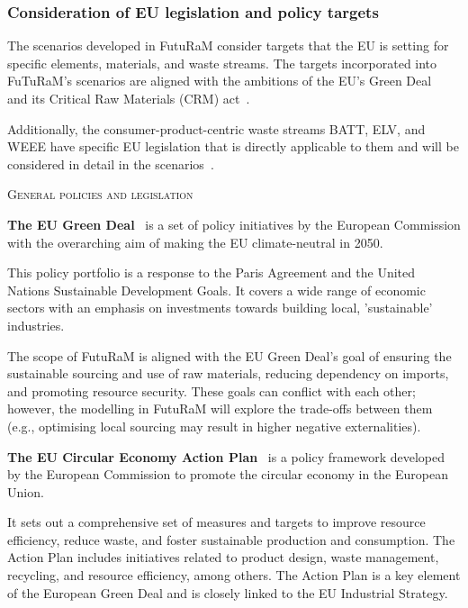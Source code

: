 \subsubsection{Consideration of EU legislation and policy targets}\label{sec:legislation}

The scenarios developed in FutuRaM consider targets that the EU is setting for specific elements, materials, and waste streams. The targets incorporated into FuTuRaM's scenarios are aligned with the ambitions of the EU's Green Deal~\cite{eu2019greendeal} and its Critical Raw Materials (CRM) act~\cite{eu2023crmact}.

Additionally, the consumer-product-centric waste streams BATT, ELV, and WEEE have specific EU legislation that is directly applicable to them and will be considered in detail in the scenarios~\cite{eu2003weee,eu2012weee,eu2012weeerecast,eu2023elv,eu2023batt,eu2020batt}.

\textsc{General policies and legislation}

\textbf{The EU Green Deal}~\cite{eu2019greendeal} is a set of policy initiatives by the European Commission with the overarching aim of making the EU climate-neutral in 2050.

This policy portfolio is a response to the Paris Agreement and the United Nations Sustainable Development Goals. It covers a wide range of economic sectors with an emphasis on investments towards building local, 'sustainable' industries.

The scope of FutuRaM is aligned with the EU Green Deal's goal of ensuring the sustainable sourcing and use of raw materials, reducing dependency on imports, and promoting resource security. These goals can conflict with each other; however, the modelling in FutuRaM will explore the trade-offs between them (e.g., optimising local sourcing may result in higher negative externalities).



\textbf{The EU Circular Economy Action Plan}~\cite{eu2020circ} is a policy framework developed by the European Commission to promote the circular economy in the European Union.

It sets out a comprehensive set of measures and targets to improve resource efficiency, reduce waste, and foster sustainable production and consumption. The Action Plan includes initiatives related to product design, waste management, recycling, and resource efficiency, among others. The Action Plan is a key element of the European Green Deal and is closely linked to the EU Industrial Strategy.



